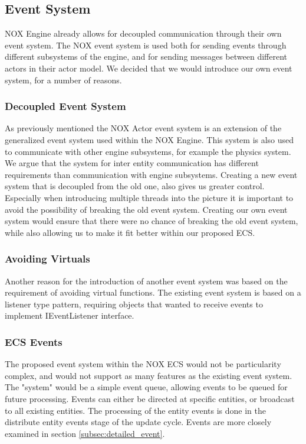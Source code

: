 \subsection{Event System}
NOX Engine already allows for decoupled communication through their own event system.
The NOX event system is used both for sending events through different subsystems of the engine,
and for sending messages between different actors in their actor model.
We decided that we would introduce our own event system, for a number of reasons.

\subsubsection{Decoupled Event System}
As previously mentioned the NOX Actor event system is an extension of the generalized event system
used within the NOX Engine. This system is also used to communicate with other engine subsystems,
for example the physics system.
We argue that the system for inter entity communication has different requirements than communication
with engine subsystems.
Creating a new event system that is decoupled from the old one, also gives us greater control.
Especially when introducing multiple threads into the picture it is important to avoid the
possibility of breaking the old event system.
Creating our own event system would ensure that there were no chance of breaking the old event system,
while also allowing us to make it fit better within our proposed ECS.

\subsubsection{Avoiding Virtuals}
Another reason for the introduction of another event system was based on the requirement of avoiding
virtual functions.
The existing event system is based on a listener type pattern,
requiring objects that wanted to receive events to implement IEventListener interface.

\subsubsection{ECS Events}
The proposed event system within the NOX ECS would not be particularity complex,
and would not support as many features as the existing event system.
The "system" would be a simple event queue, allowing events to be queued for future
processing. Events can either be directed at specific entities, or broadcast to all existing entities.
The processing of the entity events is done in the distribute entity events stage of the update cycle.
Events are more closely examined in section \ref{subsec:detailed_event}.
